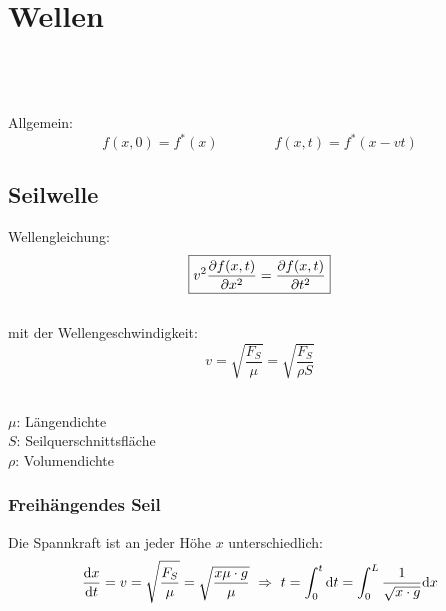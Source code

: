 



\chapter{Wellen}

\\\\
\\
Allgemein:
\[
	f(x,0)=f^*(x) \qquad \qquad f(x,t) = f^*(x-vt)
\]
\newpage


\section{Seilwelle}
Wellengleichung:
\[\boxed{
	v^2 \frac{\partial f(x,t)}{\partial x^2} = \frac{\partial f(x,t)}{\partial t^2}
}\]
\\
mit der Wellengeschwindigkeit:
\[\boxed{
	v = \sqrt{\frac{F_S}{\mu}} = \sqrt{\frac{F_S}{\rho S}}
}\]
\\
\begin{footnotesize}
	$\mu$: Längendichte\\
	$S$: Seilquerschnittsfläche\\
	$\rho$: Volumendichte
\end{footnotesize}


\subsection{Freihängendes Seil}
Die Spannkraft ist an jeder Höhe $x$ unterschiedlich:
\[
	\difrac{x}{t} = v = \sqrt{\frac{F_S}{\mu}} = \sqrt{\frac{x\mu \cdot g}{\mu}} \ \Rightarrow \ t = \int_{0}^{t}\di t = \int_{0}^{L}\frac{1}{\sqrt{x \cdot g}}\di x 
\]


